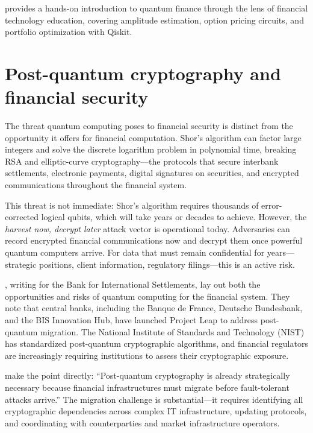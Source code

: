 \citet{huang_nus-frontiers--fintech-and-quantum-computing-2022part_nodate} provides a hands-on introduction to quantum finance through the lens of financial technology education, covering amplitude estimation, option pricing circuits, and portfolio optimization with Qiskit.

\section{Post-quantum cryptography and financial security}

The threat quantum computing poses to financial security is distinct from the opportunity it offers for financial computation. Shor's algorithm can factor large integers and solve the discrete logarithm problem in polynomial time, breaking RSA and elliptic-curve cryptography---the protocols that secure interbank settlements, electronic payments, digital signatures on securities, and encrypted communications throughout the financial system.

This threat is not immediate: Shor's algorithm requires thousands of error-corrected logical qubits, which will take years or decades to achieve. However, the \emph{harvest now, decrypt later} attack vector is operational today. Adversaries can record encrypted financial communications now and decrypt them once powerful quantum computers arrive. For data that must remain confidential for years---strategic positions, client information, regulatory filings---this is an active risk.

\citet{auer_quantum_2024}, writing for the Bank for International Settlements, lay out both the opportunities and risks of quantum computing for the financial system. They note that central banks, including the Banque de France, Deutsche Bundesbank, and the BIS Innovation Hub, have launched Project Leap to address post-quantum migration. The National Institute of Standards and Technology (NIST) has standardized post-quantum cryptographic algorithms, and financial regulators are increasingly requiring institutions to assess their cryptographic exposure.

\citet{gong_quantum_2026-1} make the point directly: ``Post-quantum cryptography is already strategically necessary because financial infrastructures must migrate before fault-tolerant attacks arrive.'' The migration challenge is substantial---it requires identifying all cryptographic dependencies across complex IT infrastructure, updating protocols, and coordinating with counterparties and market infrastructure operators.

